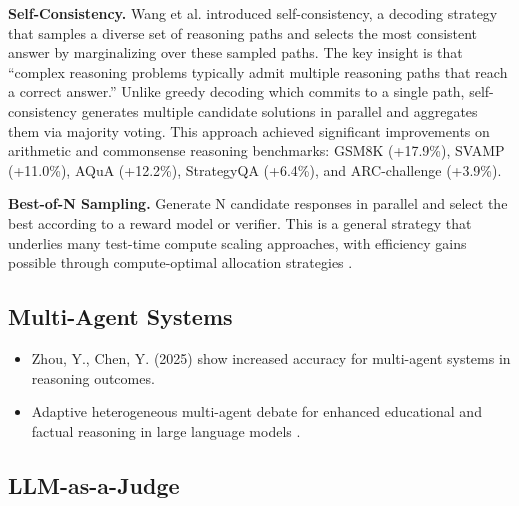 \documentclass[12pt]{article}
\begin{document}
\textbf{Self-Consistency.} Wang et al. \cite{wang2023selfconsistency} introduced self-consistency, a decoding strategy that samples a diverse set of reasoning paths and selects the most consistent answer by marginalizing over these sampled paths. The key insight is that ``complex reasoning problems typically admit multiple reasoning paths that reach a correct answer.'' Unlike greedy decoding which commits to a single path, self-consistency generates multiple candidate solutions in parallel and aggregates them via majority voting. This approach achieved significant improvements on arithmetic and commonsense reasoning benchmarks: GSM8K (+17.9\%), SVAMP (+11.0\%), AQuA (+12.2\%), StrategyQA (+6.4\%), and ARC-challenge (+3.9\%).

\textbf{Best-of-N Sampling.} Generate N candidate responses in parallel and select the best according to a reward model or verifier. This is a general strategy that underlies many test-time compute scaling approaches, with efficiency gains possible through compute-optimal allocation strategies \cite{snell2024scalingllmtesttimecompute}.

\subsection{Multi-Agent Systems}

\begin{itemize}
    \item Zhou, Y., Chen, Y. (2025) show increased accuracy for multi-agent systems in reasoning outcomes.
    \item Adaptive heterogeneous multi-agent debate for enhanced educational and factual reasoning in large language models \cite{zhou2025multiagent}.
\end{itemize}

\subsection{LLM-as-a-Judge}
\end{document}
